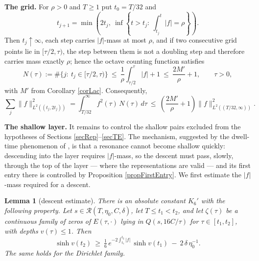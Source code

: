 \documentclass[11pt,twoside,reqno]{amsart}
\def\RR{{\mathcal{R}}}
\def\d{\delta}
\theoremstyle{plain}
\newtheorem{lemma}{Lemma}
\numberwithin{equation}{section}
\begin{document}
{\bf The grid.} For $\rho>0$ and $T\geq1$ put $t_0=T/32$ and
\begin{equation}
t_{j+1}=\min\left(2t_j,\ \inf\left\{t>t_j:\ \int_{t_j}^t|f|=\rho\right\}\right).
\label{eqGrid}
\end{equation}
Then $t_j\uparrow\infty$, each step carries $|f|$-mass at most $\rho$, and if two consecutive grid points lie in $[\tau/2,\tau)$, the step between them is not a doubling step and therefore carries mass exactly $\rho$; hence the octave counting function satisfies
\begin{equation}
N(\tau):=\#\{j:\ t_j\in[\tau/2,\tau)\}\ \leq\ \frac1\rho\int_{\tau/2}^\tau|f|+1\ \leq\ \frac{2M'}\rho+1,\qquad\tau>0,
\label{eqNgrid}
\end{equation}
with $M'$ from Corollary \ref{corLac}. Consequently,
\begin{equation}
\sum_j\|f\|^2_{L^2((t_j,2t_j))}=\int_{T/32}^\infty f^2(\tau)\,N(\tau)\,d\tau\ \leq\ \left(\frac{2M'}\rho+1\right)\|f\|^2_{L^2((T/32,\infty))}.
\label{eqGridMass}
\end{equation}

{\bf The shallow layer.} It remains to control the shallow pairs excluded from the hypotheses of Sections \ref{secRep}--\ref{secTE}. The mechanism, suggested by the dwell-time phenomenon of \cite{Scatter}, is that a resonance cannot become shallow quickly: descending into the layer requires $|f|$-mass, so the descent must pass, slowly, through the top of the layer --- where the representations are valid --- and its first entry there is controlled by Proposition \ref{propFirstEntry}. We first estimate the $|f|$-mass required for a descent.

\begin{lemma}[descent estimate]\label{lemDescent}
There is an absolute constant $K_6'$ with the following property. Let $s\in\RR(T,\eta_0,C,\d)$, let $T\leq t_1<t_2$, and let $\zeta(\tau)$ be a continuous family of zeros of $E(\tau,\cdot)$ lying in $Q(s,16C/\tau)$ for $\tau\in[t_1,t_2]$, with depths $v(\tau)\leq1$. Then
\begin{equation}
\sinh v(t_2)\ \geq\ \tfrac16\,e^{-2\int_{t_1}^{t_2}|f|}\,\sinh v(t_1)\ -\ 2\,\d\,\eta_0^{-1} .
\label{eqDescent}
\end{equation}
The same holds for the Dirichlet family.
\end{lemma}
\end{document}
